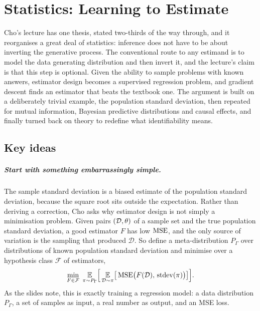 \chapter{Statistics: Learning to Estimate}
\label{ch:05-statistics-estimation}


Cho's lecture has one thesis, stated two-thirds of the way through, and it reorganises a great
deal of statistics: inference does not have to be about
inverting the generative process. The conventional route to any estimand is to model the data
generating distribution and then invert it, and the lecture's claim is that this step is
optional. Given the ability to sample problems with known answers, estimator design becomes a
supervised regression problem, and gradient descent finds an estimator that beats the textbook
one. The argument is built on a deliberately trivial example, the population standard
deviation, then repeated for mutual information, Bayesian predictive distributions and causal
effects, and finally turned back on theory to redefine what identifiability means.

\section*{Key ideas}

\paragraph{Start with something embarrassingly simple.} The sample standard deviation is a
biased estimate of the population standard deviation, because the square root sits outside
the expectation. Rather than deriving a correction, Cho asks why estimator design is not
simply a minimisation problem. Given pairs $(\mathcal{D}, \theta)$ of a sample set and the
true population standard deviation, a good estimator $F$ has low
$\mathrm{MSE}$, and the only source of variation is the sampling that produced $\mathcal{D}$. So
define a meta-distribution $P_\Gamma$ over distributions of known population standard
deviation and minimise over a hypothesis class $\mathcal{F}$ of estimators,
\[
  \min_{F \in \mathcal{F}} \;
  \operatorname*{\mathbb{E}}_{\pi \sim P_\Gamma}\Bigl[\,
    \operatorname*{\mathbb{E}}_{\mathcal{D} \sim \pi}\bigl[\,
      \mathrm{MSE}\bigl( F(\mathcal{D}),\, \mathrm{stdev}(\pi) \bigr)
    \bigr]
  \Bigr].
\]
\noindent As the slides note, this is exactly training a regression model: a data distribution
$P_\Gamma$, a set of samples as input, a real number as output, and an MSE loss.

